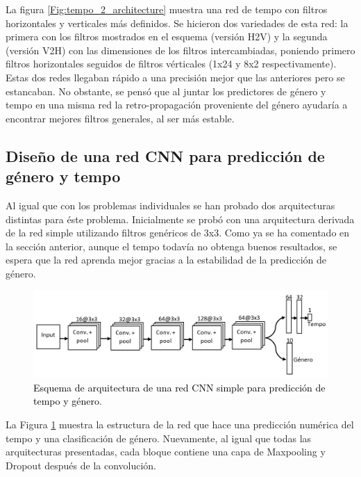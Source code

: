 La figura \ref{Fig:tempo_2_architecture} muestra una red de tempo con filtros horizontales y verticales más definidos. Se hicieron dos variedades de esta red: la primera con los filtros mostrados en el esquema (versión H2V) y la segunda (versión V2H) con las dimensiones de los filtros intercambiadas, poniendo primero filtros horizontales seguidos de filtros vérticales (1x24 y 8x2 respectivamente). Estas dos redes llegaban rápido a una precisión mejor que las anteriores pero se estancaban. No obstante, se pensó que al juntar los predictores de género y tempo en una misma red la retro-propagación proveniente del género ayudaría a encontrar mejores filtros generales, al ser más estable.

\subsection{Diseño de una red CNN para predicción de género y tempo}\label{sec:arquitectura_mixed}

\noindent Al igual que con los problemas individuales se han probado dos arquitecturas distintas para éste problema. Inicialmente se probó con una arquitectura derivada de la red simple utilizando filtros genéricos de 3x3. Como ya se ha comentado en la sección anterior, aunque el tempo todavía no obtenga buenos resultados, se espera que la red aprenda mejor gracias a la estabilidad de la predicción de género.

\begin{figure}[htb]
  \centering
  \includegraphics[width=\textwidth]{Figures/arquitectura_simple_mix.png}
  \caption{\textcolor{black}{Esquema de arquitectura de una red CNN simple para predicción de tempo y género}.}
  \label{Fig:arquitectura_simple_mix}
\end{figure}

La Figura \ref{Fig:arquitectura_simple_mix} muestra la estructura de la red que hace una predicción numérica del tempo y una clasificación de género. Nuevamente, al igual que todas las arquitecturas presentadas, cada bloque contiene una capa de Maxpooling y Dropout después de la convolución.

